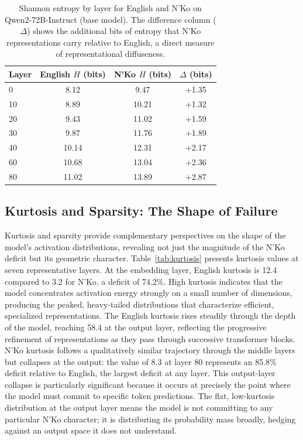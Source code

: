\documentclass[11pt]{article}
\newcommand{\nko}{N'Ko}
\begin{document}
\begin{table}[t]
\centering
\small
\caption{Shannon entropy by layer for English and \nko{} on Qwen2-72B-Instruct (base model). The difference column ($\Delta$) shows the additional bits of entropy that \nko{} representations carry relative to English, a direct measure of representational diffuseness.}
\label{tab:entropy}
\begin{tabular}{@{}lccc@{}}
\toprule
Layer & English $H$ (bits) & \nko{} $H$ (bits) & $\Delta$ (bits) \\
\midrule
0 & 8.12 & 9.47 & +1.35 \\
10 & 8.89 & 10.21 & +1.32 \\
20 & 9.43 & 11.02 & +1.59 \\
30 & 9.87 & 11.76 & +1.89 \\
40 & 10.14 & 12.31 & +2.17 \\
60 & 10.68 & 13.04 & +2.36 \\
80 & 11.02 & 13.89 & +2.87 \\
\bottomrule
\end{tabular}
\end{table}

\subsection{Kurtosis and Sparsity: The Shape of Failure}
\label{sec:kurtosis_sparsity}

Kurtosis and sparsity provide complementary perspectives on the shape of the model's activation distributions, revealing not just the magnitude of the \nko{} deficit but its geometric character. Table~\ref{tab:kurtosis} presents kurtosis values at seven representative layers. At the embedding layer, English kurtosis is 12.4 compared to 3.2 for \nko{}, a deficit of 74.2\%. High kurtosis indicates that the model concentrates activation energy strongly on a small number of dimensions, producing the peaked, heavy-tailed distributions that characterize efficient, specialized representations. The English kurtosis rises steadily through the depth of the model, reaching 58.4 at the output layer, reflecting the progressive refinement of representations as they pass through successive transformer blocks. \nko{} kurtosis follows a qualitatively similar trajectory through the middle layers but collapses at the output: the value of 8.3 at layer 80 represents an 85.8\% deficit relative to English, the largest deficit at any layer. This output-layer collapse is particularly significant because it occurs at precisely the point where the model must commit to specific token predictions. The flat, low-kurtosis distribution at the output layer means the model is not committing to any particular \nko{} character; it is distributing its probability mass broadly, hedging against an output space it does not understand.
\end{document}
